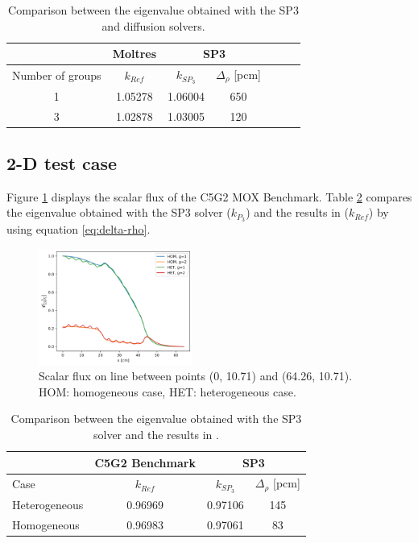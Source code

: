 \documentclass[letterpaper]{article}
\begin{document}
\begin{table}[htbp!]
\centering
\caption{Comparison between the eigenvalue obtained with the SP3 and diffusion solvers.}
\begin{tabular}{ccccccc}
\toprule
 & Moltres      & \multicolumn{2}{c}{SP3}          \\
\midrule 
Number of groups & $k_{Ref}$    & $k_{SP_3}$ & $\Delta_\rho$ [pcm] \\
\midrule
1 & 1.05278     & 1.06004   & 650 \\
3 & 1.02878     & 1.03005   & 120 \\
\bottomrule
\end{tabular}
\label{tab:1d-keff}
\end{table}

\subsection{2-D test case}
\label{sec:results2d}

Figure \ref{res:2d-bench} displays the scalar flux of the C5G2 MOX Benchmark.
Table \ref{tab:2d-keff} compares the eigenvalue obtained with the SP3 solver ($k_{P_3}$) and the results in \cite{capilla_applications_2009} ($k_{Ref}$) by using equation \ref{eq:delta-rho}.

\begin{figure}[h!]
    \centering
    \includegraphics[width=0.45\textwidth]{../C5G2-benchmark/output-2g}
    \caption{Scalar flux on line between points (0, 10.71) and (64.26, 10.71). HOM: homogeneous case, HET: heterogeneous case.}
    \label{res:2d-bench}
\end{figure}

\begin{table}[htbp!]
\centering
\caption{Comparison between the eigenvalue obtained with the SP3 solver and the results in \cite{capilla_applications_2009}.}
\begin{tabular}{lccc}
\toprule
 & C5G2 Benchmark      & \multicolumn{2}{c}{SP3}          \\
\midrule
Case & $k_{Ref}$       & $k_{SP_3}$ & $\Delta_\rho$ [pcm] \\
\midrule
Heterogeneous & 0.96969  & 0.97106  & 145  \\
Homogeneous   & 0.96983  & 0.97061  &  83  \\
\bottomrule
\end{tabular}
\label{tab:2d-keff}
\end{table}
\end{document}
